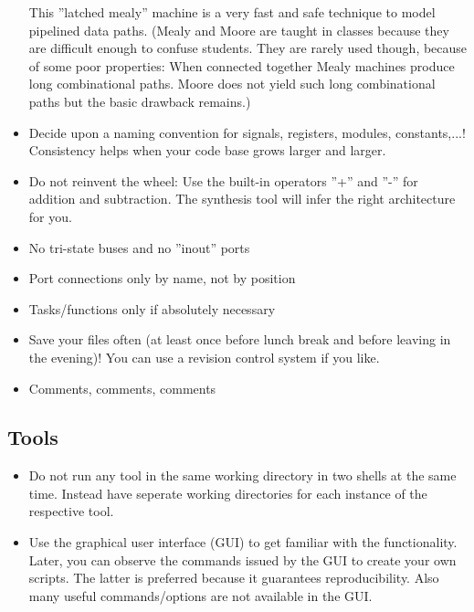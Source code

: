\begin{itemize}
\begin{center}
\end{center}
This ''latched mealy'' machine is a very fast and safe technique to model pipelined data paths. (Mealy and Moore are taught in classes because they are difficult enough to confuse students. They are rarely used though, because of some poor properties: When connected together Mealy machines produce long combinational paths. Moore does not yield such long combinational paths but the basic drawback remains.)\\

	\item Decide upon a naming convention for signals, registers, modules, constants,...! Consistency helps when your code base grows larger and larger.
	\item Do not reinvent the wheel: Use the built-in operators ''+'' and ''-'' for addition and subtraction. The synthesis tool will infer the right architecture for you.
	\item No tri-state buses and no ''inout'' ports
	\item Port connections only by name, not by position
	\item Tasks/functions only if absolutely necessary
	\item Save your files often (at least once before lunch break and before leaving in the evening)! You can use a revision control system if you like.
	\item Comments, comments, comments
\end{itemize}


\subsection{Tools}
\begin{itemize}
	\item Do not run any tool in the same working directory in two shells at the same time. Instead have seperate working directories for each instance of the respective tool.
	\item Use the graphical user interface (GUI) to get familiar with the functionality. Later, you can observe the commands issued by the GUI to create your own scripts. The latter is preferred because it guarantees reproducibility. Also many useful commands/options are not available in the GUI.
\end{itemize}

